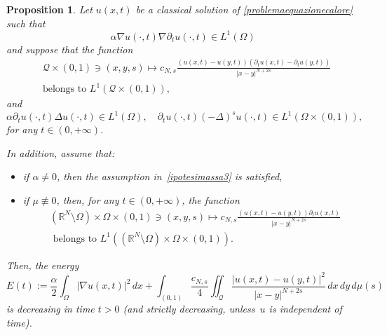 \documentclass[12pt,a4paper,intlimits,sumlimits]{amsart}
\def \R {\mathbb{R}}
\def \Q {\mathcal Q}
\theoremstyle{definition}
\theoremstyle{plain}
\newtheorem{proposition}[definition]{Proposition}
\numberwithin{equation}{section}
\begin{document}
\begin{proposition}\label{DECENSD}
Let $u(x,t)$ be a classical solution of
\eqref{problemaequazionecalore} such that 
\begin{equation}\label{ipotesienergia1}
\alpha \nabla u(\cdot,t)\nabla \partial_t u(\cdot,t)
\in L^1(\Omega)
\end{equation}and suppose that
the function
\begin{equation}\label{ipotesienergia2}\begin{split}&
\Q\times (0,1)\ni (x,y,s) \mapsto c_{N,s}
\frac{(u(x,t)-u(y,t))(\partial_t u(x,t)-\partial_t u(y,t))}{|x-y|^{N+2s}} \\&\mbox{belongs to } L^1(\Q\times (0,1)),\end{split}
\end{equation}
and
\begin{equation}\label{ipotesienergia3}
\alpha \partial_t u(\cdot,t)\Delta u(\cdot,t)\in L^1(\Omega),\quad\partial_t u(\cdot,t)(-\Delta)^s u(\cdot,t)\in L^1(\Omega\times (0,1)),
\end{equation}
for any $t\in (0,+\infty)$.

In addition, assume that:
\begin{itemize}
\item if $\alpha\neq 0$, then the assumption in~\eqref{ipotesimassa3} is satisfied,
\item if $\mu \not \equiv 0$, then, for any $t\in (0,+\infty)$, the function
\begin{equation}\label{ipotesienergia4}
\begin{split}&
(\R^N \setminus \Omega)\times \Omega \times (0,1)\ni (x,y,s)\mapsto
c_{N,s}\frac{(u(x,t)-u(y,t))\partial_t u(x,t)}{|x-y|^{N+2s}} \\
&\mbox{ belongs to }
L^1\left((\R^N \setminus \Omega)\times \Omega \times (0,1)\right).
\end{split}
\end{equation}
\end{itemize}

Then, the energy
\[
E(t):=\frac{\alpha}{2}\int_\Omega |\nabla u(x,t)|^2\,dx
+\int_{(0,1)}\frac{c_{N,s}}{4}
\iint_\Q \frac{|u(x,t)-u(y,t)|^2}{|x-y|^{N+2s}}\,dx\,dy\,d\mu(s)
\]
is decreasing in time $t>0$ (and strictly decreasing, unless~$u$ is independent of time).
\end{proposition}
\end{document}
